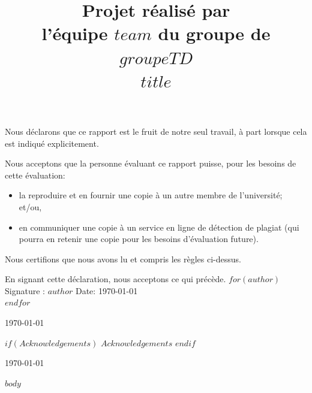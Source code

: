 \documentclass[mstat,12pt]{unswthesis}
\title{Projet réalisé par\\[0.5cm] l'équipe $team$ du groupe de $groupeTD$ \\[3cm]$title$}
\author{\Authornameonly}
\begin{document}
\beforepreface




\vskip 2pc \noindent Nous déclarons que ce rapport est le fruit de notre seul travail, à part lorsque cela est indiqué explicitement. 

\vskip 2pc  \noindent Nous acceptons que la personne évaluant ce rapport puisse, pour les besoins de cette évaluation:
\begin{itemize}
\item la reproduire et en fournir une copie à un autre membre de l'université; et/ou,
\item en communiquer une copie à un service en ligne de détection de plagiat (qui pourra en retenir une copie pour les besoins d'évaluation future).
\end{itemize}

\vskip 2pc \noindent Nous certifions que nous avons lu et compris les règles ci-dessus.\vspace{24pt}

\vskip 2pc \noindent En signant cette déclaration, nous acceptons ce qui précède.
\vskip 2pc \noindent
$for(author)$
    \noindent Signature : $author$ \hfill Date: \today \\[1cm]
$endfor$
\vskip 1pc



{\bigskip\bigskip\bigskip\noindent} \today




$if(Acknowledgements)$
$Acknowledgements$
$endif$


{\bigskip\bigskip\bigskip\noindent} \today






\afterpreface





%
%






$body$
\end{document}
